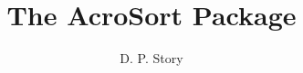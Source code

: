 \documentclass{article}
\title{The AcroSort Package}
\author{D. P. Story}
\begin{document}

\noindent\ulCornerHere\reserveSpaceByFile

\smallskip

%
%

\centering\StartSort\quad\StopSort\quad\ClearSort
\end{document}
